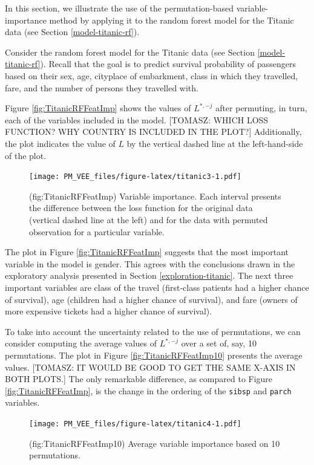 \documentclass[12pt,]{krantz}
\begin{document}
In this section, we illustrate the use of the permutation-based variable-importance method by applying it to the random forest model for the Titanic data (see Section \ref{model-titanic-rf}).

Consider the random forest model for the Titanic data (see Section \ref{model-titanic-rf}). Recall that the goal is to predict survival probability of passengers based on their sex, age, cityplace of embarkment, class in which they travelled, fare, and the number of persons they travelled with.

Figure \ref{fig:TitanicRFFeatImp} shows the values of \(L^{*,-j}\) after permuting, in turn, each of the variables included in the model. {[}TOMASZ: WHICH LOSS FUNCTION? WHY COUNTRY IS INCLUDED IN THE PLOT?{]} Additionally, the plot indicates the value of \(L\) by the vertical dashed line at the left-hand-side of the plot.

\begin{figure}
\centering
\texttt{[image: PM\_VEE\_files/figure-latex/titanic3-1.pdf]}
\caption{\label{fig:titanic3}(fig:TitanicRFFeatImp) Variable importance. Each interval presents the difference between the loss function for the original data (vertical dashed line at the left) and for the data with permuted observation for a particular variable.}
\end{figure}

The plot in Figure \ref{fig:TitanicRFFeatImp} suggests that the most important variable in the model is gender. This agrees with the conclusions drawn in the exploratory analysis presented in Section \ref{exploration-titanic}. The next three important variables are class of the travel (first-class patients had a higher chance of survival), age (children had a higher chance of survival), and fare (owners of more expensive tickets had a higher chance of survival).

To take into account the uncertainty related to the use of permutations, we can consider computing the average values of \(L^{*,-j}\) over a set of, say, 10 permutations. The plot in Figure \ref{fig:TitanicRFFeatImp10} presents the average values. {[}TOMASZ: IT WOULD BE GOOD TO GET THE SAME X-AXIS IN BOTH PLOTS.{]} The only remarkable difference, as compared to Figure \ref{fig:TitanicRFFeatImp}, is the change in the ordering of the \texttt{sibsp} and \texttt{parch} variables.

\begin{figure}
\centering
\texttt{[image: PM\_VEE\_files/figure-latex/titanic4-1.pdf]}
\caption{\label{fig:titanic4}(fig:TitanicRFFeatImp10) Average variable importance based on 10 permutations.}
\end{figure}
\end{document}
